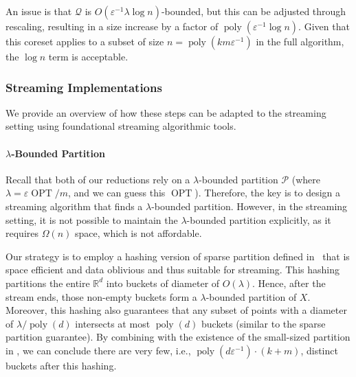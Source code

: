 \documentclass[letterpaper,11pt]{article}
\theoremstyle{plain}
\theoremstyle{definition}
\theoremstyle{remark}
\DeclareMathOperator{\poly}{poly}
\DeclareMathOperator{\OPT}{OPT}
\newcommand{\eps}{\varepsilon}
\renewcommand{\epsilon}{\varepsilon}
\newcommand{\calP}{\mathcal{P}}
\newcommand{\calQ}{\mathcal{Q}}
\begin{document}
An issue is that $\calQ$ is $O(\eps^{-1}\lambda\log n)$-bounded, but this can be adjusted through rescaling, resulting in a size increase by a factor of $\poly(\eps^{-1}\log n)$. Given that this coreset applies to a subset of size $n = \poly(km\epsilon^{-1})$ in the full algorithm, the $\log n$ term is acceptable.






































\subsubsection{Streaming Implementations}

We provide an overview of how these steps can be adapted to the streaming setting using foundational streaming algorithmic tools.

\paragraph{$\lambda$-Bounded Partition}
Recall that both of our reductions rely on a $\lambda$-bounded partition $\calP$ (where $\lambda = \epsilon \OPT / m$, and we can guess this $\OPT$). Therefore, the key is to design a streaming algorithm that finds a $\lambda$-bounded partition. However, in the streaming setting, it is not possible to maintain the $\lambda$-bounded partition explicitly, as it requires $\Omega(n)$ space, which is not affordable.

Our strategy is to employ a hashing version of sparse partition defined in~\cite{arxiv.2204.02095} that is space efficient and data oblivious and thus suitable for streaming. This hashing partitions the entire $\mathbb{R}^d$ into buckets of diameter of $O(\lambda)$. Hence, after the stream ends, those non-empty buckets form a $\lambda$-bounded partition of $X$. Moreover, this hashing also guarantees that any subset of points with a diameter of $\lambda / \poly(d)$ intersects at most $\poly(d)$ buckets (similar to the sparse partition guarantee).
By combining with the existence of the small-sized partition in ,
we can conclude there are very few, i.e., $\poly(d\epsilon^{-1}) \cdot (k  + m) $, distinct buckets after this hashing.
\end{document}
